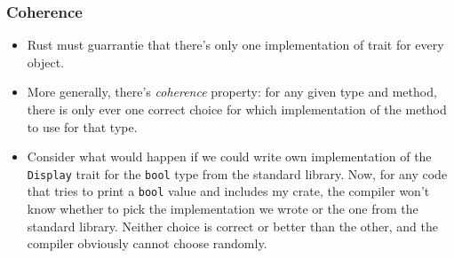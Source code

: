 \documentclass[aspectratio=1610,t]{beamer}
\begin{document}
\begin{frame}[fragile]
\frametitle{Coherence}
\begin{itemize}
    \item<1-> Rust must guarrantie that there's only one implementation of trait for every object.
    \item<2-> More generally, there's \textit{coherence} property: for any given type and method, there is only ever one correct choice for which implementation of the method to use for that type.
    \item<3-> Consider what would happen if we could write own implementation of the \texttt{Display} trait for the \texttt{bool} type from the standard library. Now, for any code that tries to print a \texttt{bool} value and includes my crate, the compiler won't know whether to pick the implementation we wrote or the one from the standard library. Neither choice is correct or better than the other, and the compiler obviously cannot choose randomly.
\end{itemize}
\end{frame}


\end{document}
